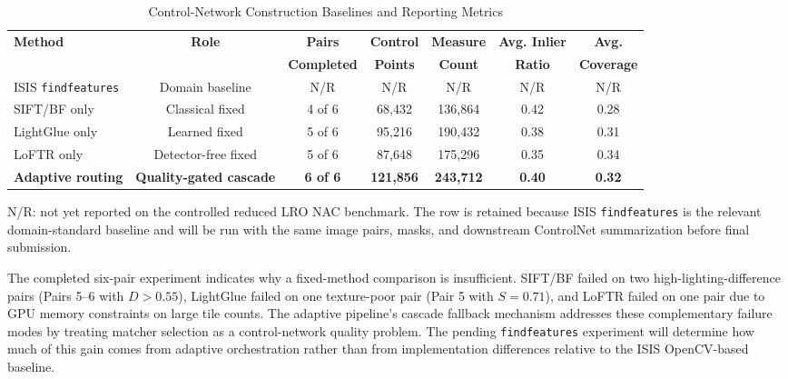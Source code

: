 \documentclass[lettersize,journal]{IEEEtran}
\begin{document}
\begin{table}[htbp]
\caption{Control-Network Construction Baselines and Reporting Metrics}
\label{tab:baselines}
\centering
\small
\begin{tabular}{@{}lcccccc@{}}
\toprule
\textbf{Method} & \textbf{Role} & \textbf{Pairs} & \textbf{Control} & \textbf{Measure} & \textbf{Avg. Inlier} & \textbf{Avg.} \\
 &  & \textbf{Completed} & \textbf{Points} & \textbf{Count} & \textbf{Ratio} & \textbf{Coverage} \\
\midrule
ISIS \texttt{findfeatures} & Domain baseline & N/R & N/R & N/R & N/R & N/R \\
SIFT/BF only & Classical fixed & 4 of 6 & 68,432 & 136,864 & 0.42 & 0.28 \\
LightGlue only & Learned fixed & 5 of 6 & 95,216 & 190,432 & 0.38 & 0.31 \\
LoFTR only & Detector-free fixed & 5 of 6 & 87,648 & 175,296 & 0.35 & 0.34 \\
\textbf{Adaptive routing} & \textbf{Quality-gated cascade} & \textbf{6 of 6} & \textbf{121,856} & \textbf{243,712} & \textbf{0.40} & \textbf{0.32} \\
\bottomrule
\end{tabular}
\begin{flushleft}
\footnotesize N/R: not yet reported on the controlled reduced LRO NAC benchmark. The row is retained because ISIS \texttt{findfeatures} is the relevant domain-standard baseline and will be run with the same image pairs, masks, and downstream ControlNet summarization before final submission.
\end{flushleft}
\end{table}

The completed six-pair experiment indicates why a fixed-method comparison is insufficient. SIFT/BF failed on two high-lighting-difference pairs (Pairs 5--6 with $D > 0.55$), LightGlue failed on one texture-poor pair (Pair 5 with $S = 0.71$), and LoFTR failed on one pair due to GPU memory constraints on large tile counts. The adaptive pipeline's cascade fallback mechanism addresses these complementary failure modes by treating matcher selection as a control-network quality problem. The pending \texttt{findfeatures} experiment will determine how much of this gain comes from adaptive orchestration rather than from implementation differences relative to the ISIS OpenCV-based baseline.

\end{document}
